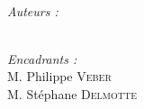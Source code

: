 \begin{titlepage}
\begin{center}
\HRule \\[3.5cm]


\begin{minipage}[t]{0.4\textwidth}
  \begin{flushleft} \large
    \emph{Auteurs :}\\
    \reportauthor \\[0.5cm]
	
	
  \end{flushleft}
\end{minipage}
\begin{minipage}[t]{0.4\textwidth}
  \begin{flushright} \large
    \emph{Encadrants :} \\
    M. Philippe \textsc{Veber} \\
    M. Stéphane \textsc{Delmotte}
	
  \end{flushright}
\end{minipage}



\end{center}

\end{titlepage}
